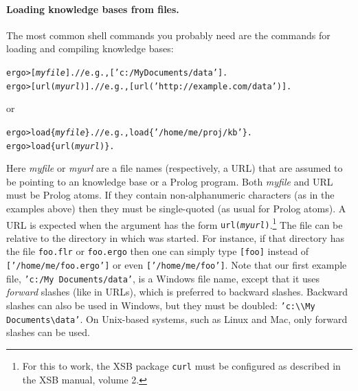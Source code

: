 \documentclass[11pt]{article}
\newcommand{\ERGO}{\mbox{\smaller{\ensuremath{\cal{E}}\smaller{{\sc{RGO}}}}}\xspace}
\newcommand{\FLSYSTEM}{\ERGO}
\newcommand{\prompt}{ergo> }
\newcommand{\flrext}{flr\xspace}
\newcommand{\ergoext}{ergo\xspace}
\newcommand{\bs}{\textbackslash}
\begin{document}
\paragraph{Loading knowledge bases from files.}
The most common shell commands you probably need are the commands for
loading and compiling knowledge bases:
\begin{alltt}
  \prompt  [\textnormal{\textit{myfile}}].        // e.g., ['c:/My Documents/data'].
  \prompt  [url(\textnormal{\textit{myurl}})].    // e.g., [url('http://example.com/data')].
\end{alltt}
or 
\begin{alltt}
  \prompt load\{\textnormal{\textit{myfile}}\}.     // e.g., load\{'/home/me/proj/kb'\}.
  \prompt load\{url(\textnormal{\textit{myurl}})\}.
\end{alltt}
Here \emph{myfile} or \emph{myurl} are a file names
(respectively, a URL) that are assumed to
be pointing to an \FLSYSTEM knowledge base
or a Prolog program. Both \emph{myfile} and URL must be
Prolog  atoms. If they contain non-alphanumeric characters (as in the examples
above) then they must be single-quoted (as usual for Prolog atoms).
A URL is expected
when the argument has the form {\tt url(\textit{myurl})}.\footnote{
  For this to work, the XSB package {\tt curl} must be configured as
  described in the XSB manual, volume 2. 
}
The file can be relative to the directory in which \FLSYSTEM was started.
For instance, if that directory has the file \texttt{foo.\flrext} or
\texttt{foo.\ergoext} then one
can simply type  \texttt{[foo]} instead of
\texttt{['/home/me/foo.\ergoext']}
or even \texttt{['/home/me/foo']}.
Note that our first example file, \texttt{'c:/My Documents/data'}, is a
Windows file name, except that it uses \emph{forward} slashes (like in
URLs), which is preferred to backward slashes. Backward slashes can also be used in
Windows,  but they must be doubled:
\texttt{'c:\bs\bs{}My Documents\bs{}data'}. On Unix-based systems, such as
Linux and Mac, only forward slashes can be used.
\end{document}
